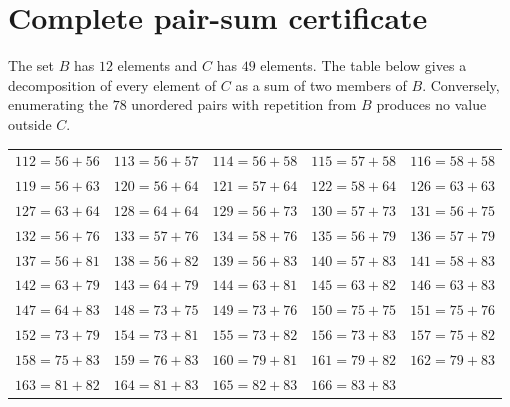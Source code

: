 \documentclass[11pt,letterpaper]{article}
\theoremstyle{remark}
\numberwithin{equation}{section}
\begin{document}
\clearpage
\appendix
\section{Complete pair-sum certificate}\label{app:pairs}
The set $B$ has $12$ elements and $C$ has $49$ elements. The table below gives a decomposition of every element of $C$ as a sum of two members of $B$. Conversely, enumerating the $78$ unordered pairs with repetition from $B$ produces no value outside $C$.
\begin{center}
\small
\renewcommand{\arraystretch}{1.15}
\begin{tabular}{@{}lllll@{}}
$112=56+56$ & $113=56+57$ & $114=56+58$ & $115=57+58$ & $116=58+58$\\
$119=56+63$ & $120=56+64$ & $121=57+64$ & $122=58+64$ & $126=63+63$\\
$127=63+64$ & $128=64+64$ & $129=56+73$ & $130=57+73$ & $131=56+75$\\
$132=56+76$ & $133=57+76$ & $134=58+76$ & $135=56+79$ & $136=57+79$\\
$137=56+81$ & $138=56+82$ & $139=56+83$ & $140=57+83$ & $141=58+83$\\
$142=63+79$ & $143=64+79$ & $144=63+81$ & $145=63+82$ & $146=63+83$\\
$147=64+83$ & $148=73+75$ & $149=73+76$ & $150=75+75$ & $151=75+76$\\
$152=73+79$ & $154=73+81$ & $155=73+82$ & $156=73+83$ & $157=75+82$\\
$158=75+83$ & $159=76+83$ & $160=79+81$ & $161=79+82$ & $162=79+83$\\
$163=81+82$ & $164=81+83$ & $165=82+83$ & $166=83+83$ & \\
\end{tabular}
\end{center}
\end{document}
